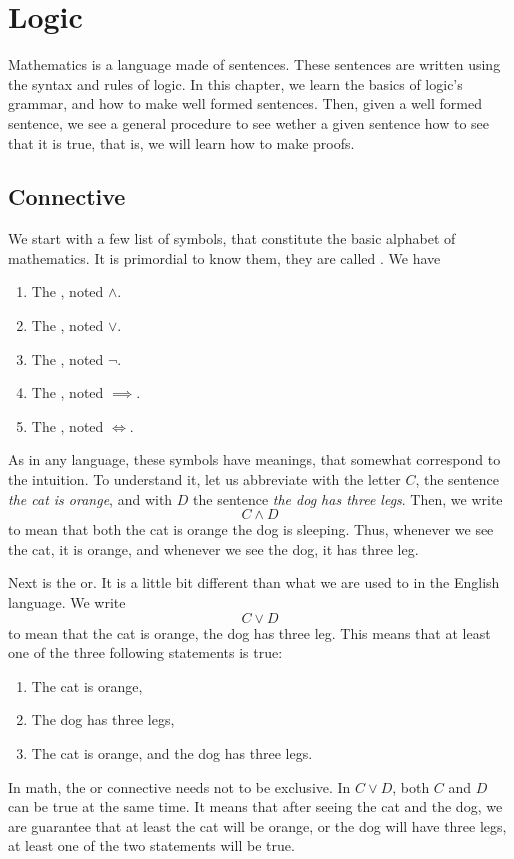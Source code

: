 \section{Logic}

Mathematics is a language made of sentences. These sentences are written using the syntax and rules of logic. In this chapter, we learn the basics of logic's grammar, and how to make well formed sentences. Then, given a well formed sentence, we see a general procedure to see wether a given sentence how to see that it is true, that is, we will learn how to make proofs. 

\subsection{Connective}

We start with a few list of symbols, that constitute the basic alphabet of mathematics. It is primordial to know them, they are called . We have

\begin{enumerate}
    \item The , noted \( \land \). 
    \item The , noted \( \lor \). 
    \item The , noted \( \neg \). 
    \item The , noted \( \implies \). 
    \item The , noted \( \iff \). 
\end{enumerate}

As in any language, these symbols have meanings, that somewhat correspond to the intuition. To understand it, let us abbreviate with the letter \( C \), the sentence \textit{the cat is orange}, and with \( D \) the sentence \textit{the dog has three legs}. Then, we write
\begin{equation*}
    C \land D
\end{equation*}
to mean that both the cat is orange  the dog is sleeping. Thus, whenever we see the cat, it is orange, and whenever we see the dog, it has three leg. 

Next is the or. It is a little bit different than what we are used to in the English language. We write
\begin{equation*}
    C \lor D
\end{equation*}
to mean that the cat is orange,  the dog has three leg. This means that at least one of the three following statements is true:
\begin{enumerate}
    \item The cat is orange,
    \item The dog has three legs,
    \item The cat is orange, and the dog has three legs.
\end{enumerate}
In math, the or connective needs not to be exclusive. In \( C \lor D \), both \( C \) and \( D \) can be true at the same time. It means that after seeing the cat and the dog, we are guarantee that at least the cat will be orange, or the dog will have three legs, at least one of the two statements will be true. 

